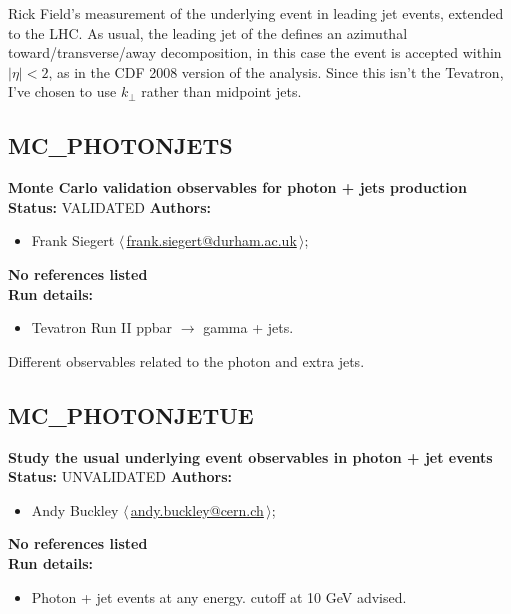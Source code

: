 \noindent Rick Field's measurement of the underlying event in leading jet events, extended to the LHC. As usual, the leading jet of the defines an azimuthal toward/transverse/away decomposition, in this case the event is accepted within $|\eta| < 2$, as in the CDF 2008 version of the analysis. Since this isn't the Tevatron, I've chosen to use $k_\perp$ rather than midpoint jets.

\clearpage


\clearpage

\subsection{MC\_PHOTONJETS}
\textbf{Monte Carlo validation observables for photon + jets production}\newline
\textbf{Status:} VALIDATED\newline
\textbf{Authors:}
\begin{itemize}
  \item Frank Siegert $\langle\,$\href{mailto:frank.siegert@durham.ac.uk}{frank.siegert@durham.ac.uk}$\,\rangle$;
\end{itemize}
\textbf{No references listed}\\ 
\textbf{Run details:}
\begin{itemize}

  \item Tevatron Run II ppbar \ensuremath{\to} gamma + jets.\end{itemize}

\noindent Different observables related to the photon and extra jets.

\clearpage


\clearpage

\subsection{MC\_PHOTONJETUE}
\textbf{Study the usual underlying event observables in photon + jet events}\newline
\textbf{Status:} UNVALIDATED\newline
\textbf{Authors:}
\begin{itemize}
  \item Andy Buckley $\langle\,$\href{mailto:andy.buckley@cern.ch}{andy.buckley@cern.ch}$\,\rangle$;
\end{itemize}
\textbf{No references listed}\\ 
\textbf{Run details:}
\begin{itemize}

  \item Photon + jet events at any energy. \pT cutoff at 10 GeV advised.\end{itemize}

